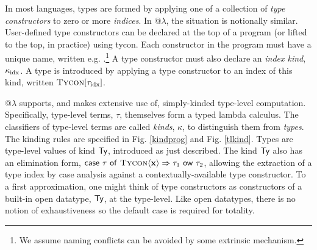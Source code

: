 \documentclass[9pt,preprint]{sigplanconf}
\begin{document}
In most languages, types are formed by applying one of a collection of \emph{type constructors} to zero or more \emph{indices}. In @$\lambda$, the situation is notionally similar. User-defined type constructors can be declared at the top of a program (or lifted to the top, in practice) using \textsf{tycon}. Each constructor in the program must have a unique name, written e.g. .\footnote{We assume naming conflicts can be avoided by some extrinsic mechanism.} A type constructor must also declare an \emph{index kind}, $\kappa_{\text{idx}}$. A type is introduced by applying a type constructor to an index of this kind, written $\textsc{Tycon}[{\tau_{\text{idx}}}]$. 

@$\lambda$ supports, and makes extensive use of, simply-kinded type-level computation. Specifically, type-level terms, $\tau$, themselves form a typed lambda calculus. The classifiers of type-level terms are called \emph{kinds}, $\kappa$, to distinguish them from  \emph{types}. The kinding rules are specified in Fig. \ref{kindprog} and Fig. \ref{tlkind}. Types are  type-level values of kind ${\sf Ty}$, introduced as just described. The kind ${\sf Ty}$ also has an elimination form, ${\sf case}~\tau~{\sf of}~\textsc{Tycon}\langle{\bf x}\rangle\Rightarrow\tau_1~{\sf ow}~\tau_2$, allowing the extraction of a type index by case analysis against a contextually-available type constructor. To a first approximation, one might think of type constructors as constructors of a built-in open datatype, ${\sf Ty}$, at the type-level. Like open datatypes, there is no notion of exhaustiveness so the default case is required for totality.
\end{document}
